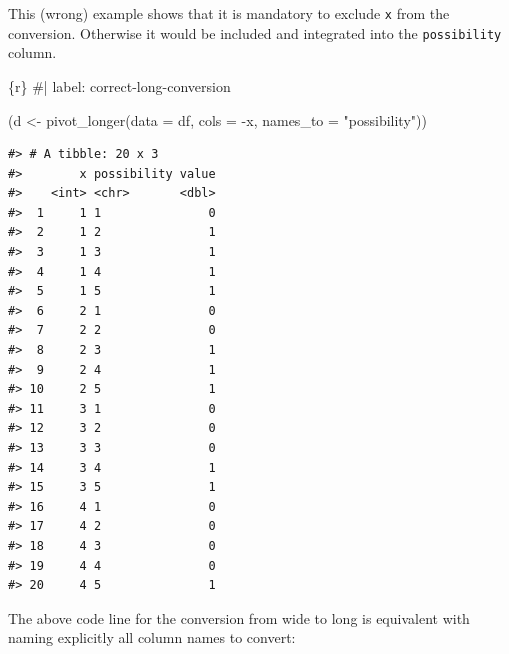 \documentclass[
  letterpaper,
  DIV=11,
  numbers=noendperiod]{scrreprt}
\newenvironment{Shaded}{\begin{snugshade}}{\end{snugshade}}
\newcommand{\AttributeTok}[1]{\textcolor[rgb]{0.40,0.45,0.13}{#1}}
\newcommand{\CommentTok}[1]{\textcolor[rgb]{0.37,0.37,0.37}{#1}}
\newcommand{\FunctionTok}[1]{\textcolor[rgb]{0.28,0.35,0.67}{#1}}
\newcommand{\InformationTok}[1]{\textcolor[rgb]{0.37,0.37,0.37}{#1}}
\newcommand{\NormalTok}[1]{\textcolor[rgb]{0.00,0.23,0.31}{#1}}
\newcommand{\OtherTok}[1]{\textcolor[rgb]{0.00,0.23,0.31}{#1}}
\newcommand{\SpecialCharTok}[1]{\textcolor[rgb]{0.37,0.37,0.37}{#1}}
\newcommand{\StringTok}[1]{\textcolor[rgb]{0.13,0.47,0.30}{#1}}
\begin{document}
This (wrong) example shows that it is mandatory to exclude \texttt{x}
from the conversion. Otherwise it would be included and integrated into
the \texttt{possibility} column.

\begin{Shaded}
\begin{Highlighting}[]
\InformationTok{\textasciigrave{}\textasciigrave{}\textasciigrave{}\{r\}}
\CommentTok{\#| label: correct{-}long{-}conversion}

\NormalTok{(d }\OtherTok{\textless{}{-}} 
    \FunctionTok{pivot\_longer}\NormalTok{(}\AttributeTok{data =}\NormalTok{ df, }\AttributeTok{cols =} \SpecialCharTok{{-}}\NormalTok{x, }\AttributeTok{names\_to =} \StringTok{"possibility"}\NormalTok{))}
\InformationTok{\textasciigrave{}\textasciigrave{}\textasciigrave{}}
\end{Highlighting}
\end{Shaded}

\begin{verbatim}
#> # A tibble: 20 x 3
#>        x possibility value
#>    <int> <chr>       <dbl>
#>  1     1 1               0
#>  2     1 2               1
#>  3     1 3               1
#>  4     1 4               1
#>  5     1 5               1
#>  6     2 1               0
#>  7     2 2               0
#>  8     2 3               1
#>  9     2 4               1
#> 10     2 5               1
#> 11     3 1               0
#> 12     3 2               0
#> 13     3 3               0
#> 14     3 4               1
#> 15     3 5               1
#> 16     4 1               0
#> 17     4 2               0
#> 18     4 3               0
#> 19     4 4               0
#> 20     4 5               1
\end{verbatim}

The above code line for the conversion from wide to long is equivalent
with naming explicitly all column names to convert:
\end{document}
